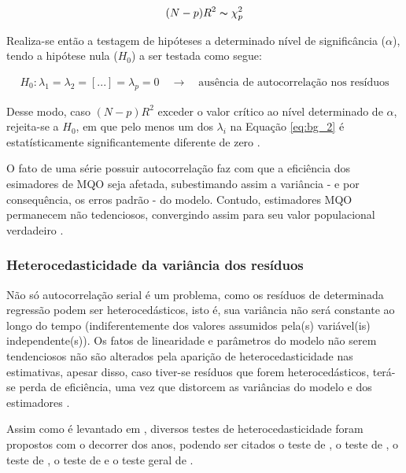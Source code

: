 \begin{ceqn}
\begin{align} \label{eq:chi_squared}
(N-p) R^2 \thicksim \chi_{p}^2
\end{align}
\end{ceqn}

Realiza-se então a testagem de hipóteses a determinado nível de significância ($\alpha$), tendo a hipótese nula ($H_{0}$) a ser testada como segue:

\begin{ceqn}
\begin{align} \label{eq:h0_bg_test}
H_{0}: \lambda_{1} = \lambda_{2} = [...] = \lambda_{p} = 0 \quad \rightarrow \quad \text{ausência de autocorrelação nos resíduos}
\end{align}
\end{ceqn}

Desse modo, caso $(N-p) R^2$ exceder o valor crítico ao nível determinado de $\alpha$, rejeita-se a $H_{0}$, em que pelo menos um dos $\lambda_{i}$ na Equação \eqref{eq:bg_2} é estatísticamente significantemente diferente de zero \cite{gujarati_ecn2011, bueno2008}.

O fato de uma série possuir autocorrelação faz com que a eficiência dos esimadores de MQO seja afetada, subestimando assim a variância - e por consequência, os erros padrão - do modelo. Contudo, estimadores MQO permanecem não tedenciosos, convergindo assim para seu valor populacional verdadeiro \cite{gujarati_ecn2011}.

\subsubsection{Heterocedasticidade da variância dos resíduos}

Não só autocorrelação serial é um problema, como os resíduos de determinada regressão podem ser heterocedásticos, isto é, sua variância não será constante ao longo do tempo (indiferentemente dos valores assumidos pela(s) variável(is) independente(s)). Os fatos de linearidade e parâmetros do modelo não serem tendenciosos não são alterados pela aparição de heterocedasticidade nas estimativas, apesar disso, caso tiver-se resíduos que forem heterocedásticos, terá-se perda de eficiência, uma vez que distorcem as variâncias do modelo e dos estimadores \cite{gujarati_ecn2011}.

Assim como é levantado em , diversos testes de heterocedasticidade foram propostos com o decorrer dos anos, podendo ser citados o teste de , o teste de , o teste de , o teste de  e o teste geral de .

